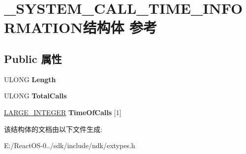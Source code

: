 \hypertarget{struct___s_y_s_t_e_m___c_a_l_l___t_i_m_e___i_n_f_o_r_m_a_t_i_o_n}{}\section{\+\_\+\+S\+Y\+S\+T\+E\+M\+\_\+\+C\+A\+L\+L\+\_\+\+T\+I\+M\+E\+\_\+\+I\+N\+F\+O\+R\+M\+A\+T\+I\+O\+N结构体 参考}
\label{struct___s_y_s_t_e_m___c_a_l_l___t_i_m_e___i_n_f_o_r_m_a_t_i_o_n}
\subsection*{Public 属性}
\begin{DoxyCompactItemize}
\item 
\mbox{\label{struct___s_y_s_t_e_m___c_a_l_l___t_i_m_e___i_n_f_o_r_m_a_t_i_o_n_ad93a5bad776ceb8a8a260b91217288c4}} 
U\+L\+O\+NG {\bfseries Length}
\item 
\mbox{\label{struct___s_y_s_t_e_m___c_a_l_l___t_i_m_e___i_n_f_o_r_m_a_t_i_o_n_a6888f429caf1144976b45f77f79b99dd}} 
U\+L\+O\+NG {\bfseries Total\+Calls}
\item 
\mbox{\label{struct___s_y_s_t_e_m___c_a_l_l___t_i_m_e___i_n_f_o_r_m_a_t_i_o_n_ae76fd1fa393389b7ba8763b492ab02a5}} 
\hyperlink{union___l_a_r_g_e___i_n_t_e_g_e_r}{L\+A\+R\+G\+E\+\_\+\+I\+N\+T\+E\+G\+ER} {\bfseries Time\+Of\+Calls} \mbox{[}1\mbox{]}
\end{DoxyCompactItemize}


该结构体的文档由以下文件生成\+:\begin{DoxyCompactItemize}
\item 
E\+:/\+React\+O\+S-\/0../sdk/include/ndk/extypes.\+h\end{DoxyCompactItemize}
